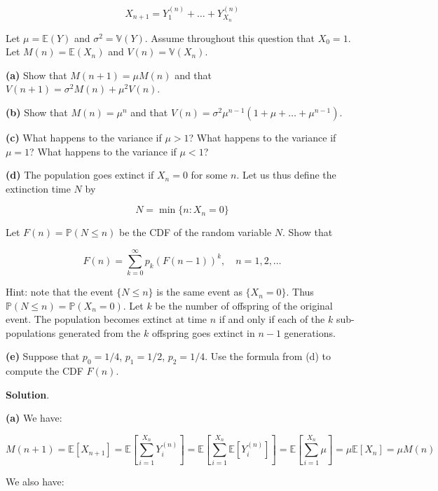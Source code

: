\[ X_{n+1} = Y_{1}^{(n)} + \dots + Y_{X_{n}}^{(n)}\]

Let \(\mu = \mathbb{E}(Y)\) and \(\sigma^{2} = \mathbb{V}(Y)\). Assume
throughout this question that \(X_{0} = 1\). Let
\(M(n) = \mathbb{E}(X_{n})\) and \(V(n) = \mathbb{V}(X_{n})\).

\textbf{(a)} Show that \(M(n + 1) = \mu M(n)\) and that $V(n + 1) =
\sigma^{2} M(n) + \mu^{2} V(n) $.

\textbf{(b)} Show that \(M(n) = \mu^{n}\) and that
\(V(n) = \sigma^{2} \mu^{n-1} (1 + \mu + \dots + \mu^{n - 1})\).

\textbf{(c)} What happens to the variance if \(\mu > 1\)? What happens
to the variance if \(\mu = 1\)? What happens to the variance if
\(\mu < 1\)?

\textbf{(d)} The population goes extinct if \(X_{n} = 0\) for some \(n\).
Let us thus define the extinction time \(N\) by

\[ N = \min \{ n : X_{n} = 0 \} \]

Let \(F(n) = \mathbb{P}(N \leq n)\) be the CDF of the random variable
\(N\). Show that

\[ F(n) = \sum_{k=0}^{\infty} p_{k} \left( F(n - 1) \right)^{k}, \quad n = 1, 2, \dots \]

Hint: note that the event \(\{ N \leq n \}\) is the same event as
\(\{ X_{n} = 0 \}\). Thus \(\mathbb{P}(N \leq n) = \mathbb{P}(X_{n} = 0)\).
Let \(k\) be the number of offspring of the original event. The
population becomes extinct at time \(n\) if and only if each of the
\(k\) sub-populations generated from the \(k\) offspring goes extinct in
\(n - 1\) generations.

\textbf{(e)} Suppose that \(p_{0} = 1/4\), \(p_{1} = 1/2\), \(p_{2} = 1/4\).
Use the formula from (d) to compute the CDF \(F(n)\).

\textbf{Solution}.

\textbf{(a)} We have:

\[ M(n + 1) = \mathbb{E}[X_{n + 1}] = \mathbb{E}\left[ \sum_{i = 1}^{X_{n}} Y_{i}^{(n)} \right] = \mathbb{E}\left[ \sum_{i = 1}^{X_{n}} \mathbb{E}[Y_{i}^{(n)}] \right] = \mathbb{E}\left[ \sum_{i = 1}^{X_{n}} \mu \right]  = \mu \mathbb{E}[X_{n}] = \mu M(n)\]

We also have:

